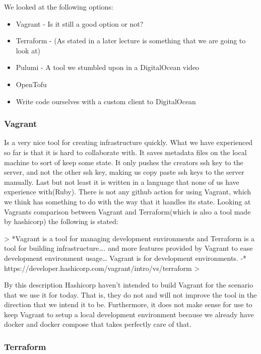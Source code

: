 We looked at the following options:

\begin{itemize}
    \item Vagrant - Is it still a good option or not?
    \item Terraform - (As stated in a later lecture is something that we are going to look at)
    \item Pulumi - A tool we stumbled upon in a DigitalOcean video
    \item OpenTofu
    \item Write code ourselves with a custom client to DigitalOcean
\end{itemize}

\subsubsection{Vagrant}

Is a very nice tool for creating infrastructure quickly. What we have experienced so far is that it is hard to collaborate with. It saves metadata files on the local machine to sort of keep some state. It only pushes the creators ssh key to the server, and not the other ssh key, making us copy paste ssh keys to the server manually. Last but not least it is written in a language that none of us have experience with(Ruby).
There is not any github action for using Vagrant, which we think has something to do with the way that it handles its state. Looking at Vagrants comparison between Vagrant and Terraform(which is also a tool made by hashicorp) the following is stated: 

> *Vagrant is a tool for managing development environments and Terraform is a tool for building infrastructure…. and more features provided by Vagrant to ease development environment usage… Vagrant is for development environments.
-* https://developer.hashicorp.com/vagrant/intro/vs/terraform
> 

By this description Hashicorp haven’t intended to build Vagrant for the scenario that we use it for today. That is, they do not and will not improve the tool in the direction that we intend it to be. Furthermore, it does not make sense for use to keep Vagrant to setup a local development environment because we already have docker and docker compose that takes perfectly care of that.

\subsubsection{Terraform}

